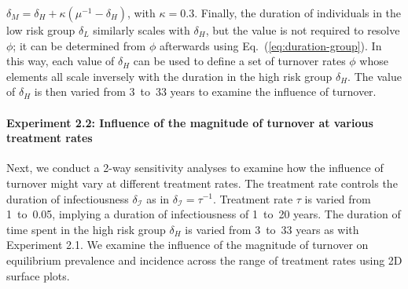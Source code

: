 $\delta_M = \delta_H + \kappa \left(\mu^{-1} - \delta_H\right)$, with $\kappa = 0.3$.
Finally, the duration of individuals in the low risk group $\delta_L$
similarly scales with $\delta_H$,
but the value is not required to resolve $\phi$;
it can be determined from $\phi$ afterwards
using Eq.~(\ref{eq:duration-group}).
In this way, each value of $\delta_H$ can be used to define a set of turnover rates $\phi$
whose elements all scale inversely with the duration in the high risk group $\delta_H$.       %
The value of $\delta_H$ is then varied from 3~to~33 years to examine the influence of turnover.
\par
\paragraph{Experiment 2.2: Influence of the magnitude of turnover at various treatment rates} %
Next, we conduct a 2-way sensitivity analyses to examine how the influence of turnover might vary at different treatment rates.
The treatment rate controls the duration of infectiousness $\delta_{\mathcal{I}}$
as in $\delta_{\mathcal{I}} = \tau^{-1}$.
Treatment rate $\tau$ is varied from 1~to~0.05,
implying a duration of infectiousness of 1~to~20 years.
The duration of time spent in the high risk group $\delta_H$ is varied from 3~to~33 years as with Experiment 2.1. %
We examine the influence of the magnitude of turnover on equilibrium prevalence and incidence across the
range of treatment rates using 2D surface plots.
